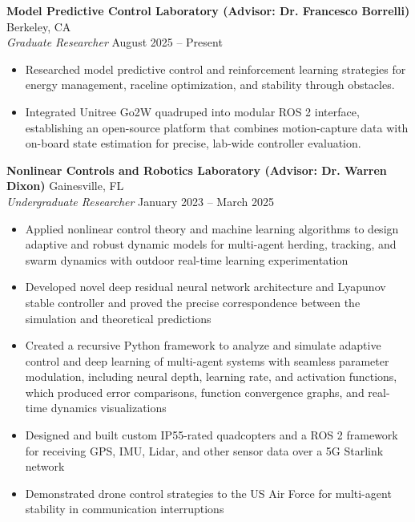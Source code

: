 \documentclass[10pt]{article}
\begin{document}
\textbf{Model Predictive Control Laboratory (Advisor: Dr. Francesco Borrelli)} \hfill Berkeley, CA \\
\textit{Graduate Researcher} \hfill August 2025 -- Present
\begin{itemize}[left=0em, itemsep=0.3em] %
    \footnotesize
    \fontsize{10pt}{11pt}\selectfont 
    \item Researched model predictive control and reinforcement learning strategies for energy management, raceline optimization, and stability through obstacles.
    \item Integrated Unitree Go2W quadruped into modular ROS 2 interface, establishing an open-source platform that combines motion-capture data with on-board state estimation for precise, lab-wide controller evaluation.
\end{itemize}

\textbf{Nonlinear Controls and Robotics Laboratory (Advisor: Dr. Warren Dixon)} \hfill Gainesville, FL \\
\textit{Undergraduate Researcher} \hfill January 2023 -- March 2025
\begin{itemize}[left=0em, itemsep=0.3em] %
    \footnotesize
    \fontsize{10pt}{11pt}\selectfont 
    \item Applied nonlinear control theory and machine learning algorithms to design adaptive and robust dynamic models for multi-agent herding, tracking, and swarm dynamics with outdoor real-time learning experimentation
    \item Developed novel deep residual neural network architecture and Lyapunov stable controller and proved the precise correspondence between the simulation and theoretical predictions
    \item Created a recursive Python framework to analyze and simulate adaptive control and deep learning of multi-agent systems with seamless parameter modulation, including neural depth, learning rate, and activation functions, which produced error comparisons, function convergence graphs, and real-time dynamics visualizations 
    \item Designed and built custom IP55-rated quadcopters and a ROS 2 framework for receiving GPS, IMU, Lidar, and other sensor data over a 5G Starlink network
    \item Demonstrated drone control strategies to the US Air Force for multi-agent stability in communication interruptions
\end{itemize}
\end{document}
